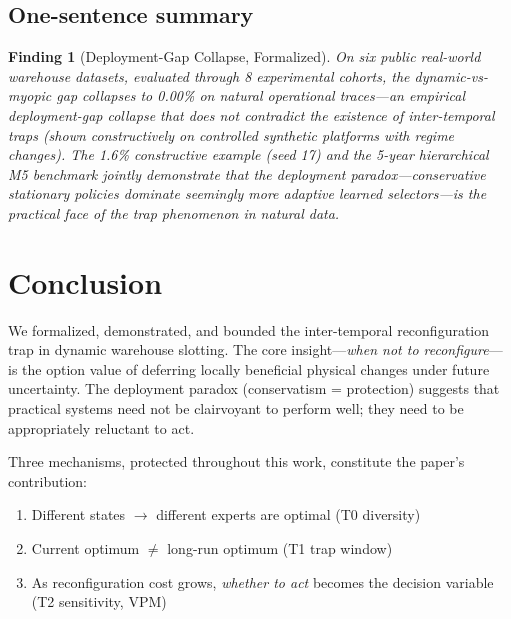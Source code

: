 \documentclass[11pt,a4paper]{article}
\newtheorem{finding}{Finding}
\begin{document}
\subsection{One-sentence summary}

\begin{finding}[Deployment-Gap Collapse, Formalized]
On six public real-world warehouse datasets, evaluated through 8
experimental cohorts, the dynamic-vs-myopic gap collapses to 0.00\%
on natural operational traces---an \emph{empirical deployment-gap
collapse} that does not contradict the existence of inter-temporal
traps (shown constructively on controlled synthetic platforms with
regime changes). The 1.6\% constructive example (seed 17) and the
5-year hierarchical M5 benchmark jointly demonstrate that the
deployment paradox---conservative stationary policies dominate
seemingly more adaptive learned selectors---is the practical face of
the trap phenomenon in natural data.
\end{finding}

\section{Conclusion}\label{sec:conclusion}

We formalized, demonstrated, and bounded the inter-temporal
reconfiguration trap in dynamic warehouse slotting. The core
insight---\emph{when not to reconfigure}---is the option value of deferring
locally beneficial physical changes under future uncertainty. The
deployment paradox (conservatism = protection) suggests that practical
systems need not be clairvoyant to perform well; they need to be
appropriately reluctant to act.

Three mechanisms, protected throughout this work, constitute the paper's
contribution:
\begin{enumerate}
\item Different states $\to$ different experts are optimal (T0 diversity)
\item Current optimum $\neq$ long-run optimum (T1 trap window)
\item As reconfiguration cost grows, \emph{whether to act} becomes the
decision variable (T2 sensitivity, VPM)
\end{enumerate}
\end{document}
